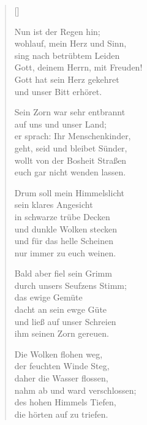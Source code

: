 \begin{multicols}{2}
\settowidth{\versewidth}{Sein Zorn war sehr entbrannt}
\begin{verse}[\versewidth]

 Nun ist der Regen hin;\\
wohlauf, mein Herz und Sinn,\\
sing nach betrübtem Leiden\\
Gott, deinem Herrn, mit Freuden!\\
Gott hat sein Herz gekehret\\
und unser Bitt erhöret.

 Sein Zorn war sehr entbrannt\\
auf uns und unser Land;\\
er sprach: Ihr Menschenkinder,\\
geht, seid und bleibet Sünder,\\
wollt von der Bosheit Straßen\\
euch gar nicht wenden lassen.

 Drum soll mein Himmelslicht\\
sein klares Angesicht\\
in schwarze trübe Decken\\
und dunkle Wolken stecken\\
und für das helle Scheinen\\
nur immer zu euch weinen.

 Bald aber fiel sein Grimm\\
durch unsers Seufzens Stimm;\\
das ewige Gemüte\\
dacht an sein ewge Güte\\
und ließ auf unser Schreien\\
ihm seinen Zorn gereuen.

 Die Wolken flohen weg,\\
der feuchten Winde Steg,\\
daher die Wasser flossen,\\
nahm ab und ward verschlossen;\\
des hohen Himmels Tiefen,\\
die hörten auf zu triefen.


\end{verse}
\end{multicols}
